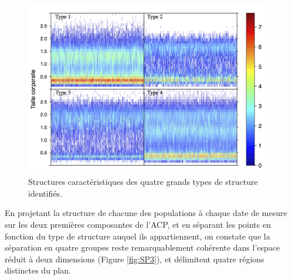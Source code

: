 \begin{figure}[!ht]
\begin{center}
\includegraphics[width=0.95\textwidth]{1_CorpsDeThese/Resumes/Fig/SP02c}
\caption[Quatres grands
types de structures]{Structures caractéristiques des quatre grands types de
structure identifiés.}
\label{fig:SP3a}
\end{center}
\end{figure}

En projetant la structure de chacune des populations à chaque date de mesure
sur les deux premières composantes de l'ACP, et en séparant les points en
fonction du type de structure auquel ils appartiennent, on constate que la
séparation en quatre groupes reste remarquablement cohérente dans l'espace
réduit à deux dimensions (Figure \ref{fig:SP3}), et délimitent quatre régions
distinctes du plan.

